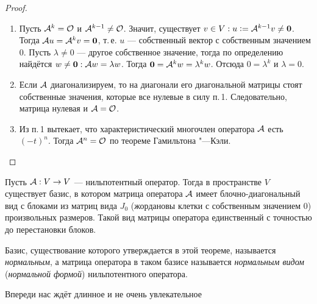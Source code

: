 \begin{proof}
    \begin{enumerate}
        \item Пусть $\mathcal{A}^k = \mathcal{O}$ и $\mathcal{A}^{k - 1} \ne \mathcal{O}$. Значит, существует $v \in V: u \vcentcolon = \mathcal{A}^{k - 1}v \ne \boldsymbol{0}$. Тогда $\mathcal{A} u = \mathcal{A}^kv = \boldsymbol{0}$, т.\,е. $u$ --- собственный вектор с собственным значением $0$. Пусть $\lambda \ne 0$ --- другое собственное значение, тогда по определению найдётся $w \ne \boldsymbol{0}: \mathcal{A} w = \lambda w$. Тогда $\boldsymbol{0} = \mathcal{A}^kw = \lambda^kw$. Отсюда $0 = \lambda^k$ и $\lambda = 0$.
        \item Если $\mathcal{A}$ диагонализируем, то на диагонали его диагональной матрицы стоят собственные значения, которые все нулевые в силу п.\,1. Следовательно, матрица нулевая и $\mathcal{A} = \mathcal{O}$.
        \item Из п.\,1 вытекает, что характеристический многочлен оператора $\mathcal{A}$ есть $(-t)^n$. Тогда $\mathcal{A}^n = \mathcal{O}$ по теореме Гамильтона "---Кэли.
    \end{enumerate}
\end{proof}

\begin{theorem}
    Пусть $\mathcal{A}: V \to V$ --- нильпотентный оператор. Тогда в пространстве $V$ существует базис, в котором матрица оператора $\mathcal{A}$ имеет блочно-диагональный вид с блоками из матриц вида $J_0$ (жордановы клетки с собственным значением $0$) произвольных размеров. Такой вид матрицы оператора единственный с точностью до перестановки блоков.
\end{theorem}

\begin{definition}
    Базис, существование которого утверждается в этой теореме, называется \textit{нормальным}, а матрица оператора в таком базисе называется \textit{нормальным видом} (\textit{нормальной формой}) нильпотентного оператора.
\end{definition}

Впереди нас ждёт длинное и не очень увлекательное

